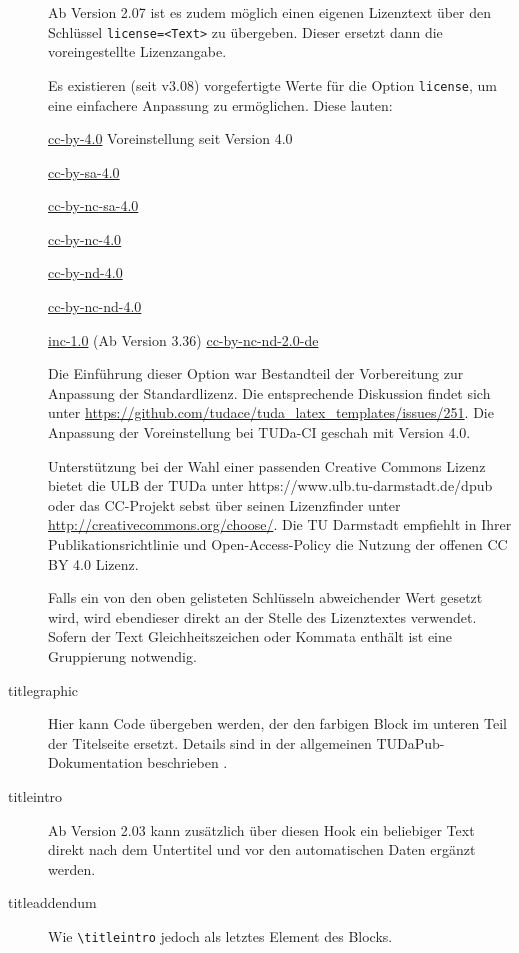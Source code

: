 \documentclass[
	german,%
	accentcolor=9c,%
	ruledheaders=section,%
	class=report,%
	thesis={type=bachelor},%
	fontsize=11pt,%
	parskip=half-,%
	custommargins=true,%
	marginpar=false,%
]{tudapub}
\newcommand*{\code}[1]{\texttt{#1}}
\let\tbs\textbackslash
\begin{document}
\begin{description}
	      Ab Version 2.07 ist es zudem möglich einen eigenen Lizenztext über den Schlüssel \verb|license=<Text>| zu übergeben. Dieser ersetzt dann die voreingestellte Lizenzangabe.

	      Es existieren (seit v3.08) vorgefertigte Werte für die Option \verb|license|, um eine einfachere Anpassung zu ermöglichen. Diese lauten:

	      \parbox[t]{.5\linewidth}{%
		      \ttfamily
		      \href{https://creativecommons.org/licenses/by/4.0/}{cc-by-4.0} \textnormal{Voreinstellung seit Version 4.0}\par
		      \href{https://creativecommons.org/licenses/by-sa/4.0/}{cc-by-sa-4.0}\par
		      \href{https://creativecommons.org/licenses/by-nc-sa/4.0/}{cc-by-nc-sa-4.0}\par
		      \href{https://creativecommons.org/licenses/by-nc-/4.0/}{cc-by-nc-4.0}\par
	      }%
	      \parbox[t]{.5\linewidth}{
		      \ttfamily
		      \href{https://creativecommons.org/licenses/by-nd/4.0/}{cc-by-nd-4.0}\par
		      \href{https://creativecommons.org/licenses/by-nc-nd/4.0/}{cc-by-nc-nd-4.0}\par
		      \href{https://rightsstatements.org/page/InC/1.0/}{inc-1.0}\textnormal{ (Ab Version 3.36)}
		      \href{https://creativecommons.org/licenses/by-nc-nd/2.0/}{cc-by-nc-nd-2.0-de}\par
	      }

	      Die Einführung dieser Option war Bestandteil der Vorbereitung zur Anpassung der Standardlizenz.
	      Die entsprechende Diskussion findet sich unter \url{https://github.com/tudace/tuda_latex_templates/issues/251}. Die Anpassung der Voreinstellung bei TUDa-CI geschah mit Version 4.0.

	      Unterstützung bei der Wahl einer passenden Creative Commons Lizenz bietet die ULB der TUDa unter https://www.ulb.tu-darmstadt.de/dpub  oder  das CC-Projekt sebst über seinen Lizenzfinder unter \url{http://creativecommons.org/choose/}.
	      Die TU Darmstadt empfiehlt in Ihrer Publikationsrichtlinie und Open-Access-Policy die Nutzung der offenen CC BY 4.0 Lizenz.

	      Falls ein von den oben gelisteten Schlüsseln abweichender Wert gesetzt wird, wird ebendieser direkt an der Stelle des Lizenztextes verwendet. Sofern der Text Gleichheitszeichen oder Kommata enthält ist eine Gruppierung notwendig.
	\item[titlegraphic] Hier kann Code übergeben werden, der den farbigen Block im unteren Teil der Titelseite ersetzt. Details sind in der allgemeinen TUDaPub-Dokumentation beschrieben \cite{tudapub}.
	\item[titleintro] Ab Version 2.03 kann zusätzlich über diesen Hook ein beliebiger Text direkt nach dem Untertitel und vor den automatischen Daten ergänzt werden.
	\item[titleaddendum] Wie \code{\tbs{}titleintro} jedoch als letztes Element des Blocks.
\end{description}
\end{document}
